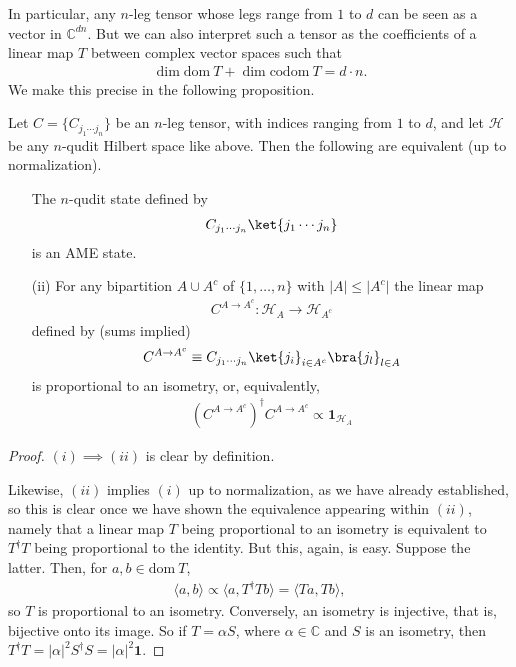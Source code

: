 In particular, any $n$-leg tensor whose legs range from $1$ to $d$ can be seen as a vector in $\mathbb{C}^{dn}$. But we can also interpret such a tensor as the coefficients of a linear map $T$ between complex vector spaces such that 
\begin{align*}
\dim\mathrm{dom~} T + \dim\mathrm{codom~} T = d\cdot n.
\end{align*}
We make this precise in the following proposition.

\begin{proposition}\label{prop:tensorAME}
Let $C=\{C_{j_1\cdots j_n}\}$ be an $n$-leg tensor, with indices ranging from $1$ to $d$, and let $\mathcal{H}$ be any $n$-qudit Hilbert space like above. Then the following are equivalent (up to normalization).
\begin{itemize}
\item[\text{(i)}] The $n$-qudit state defined by 
\begin{align*}
C_{j_1\cdots j_n}\ket{j_1\cdots j_n}
\end{align*}
is an AME state.
\item[(ii)] For any bipartition $A\cup A^c$ of $\{1,\ldots, n\}$ with $\lvert A \rvert\leq \lvert A^c \rvert$ the linear map
\begin{align*}
C^{A\to A^c} : \mathcal{H}_A \rightarrow\mathcal{H}_{A^c}
\end{align*}
defined by (sums implied)
\begin{align*}
C^{A\to A^c}\equiv C_{j_1\cdots j_n} \ket{j_i}_{i\in A^c}\bra{j_l}_{l\in A}
\end{align*}
is proportional to an isometry, or, equivalently, 
\begin{align*}
\left(C^{A\to A^c}\right)^\dagger C^{A\to A^c} \propto \mathbf{1}_{\mathcal{H}_A}
\end{align*}
\end{itemize}
\begin{proof}
$(i)\implies (ii)$ is clear by definition.

 Likewise, $(ii)$ implies $(i)$ up to normalization, as we have already established, so this is clear once we have shown the equivalence appearing within $(ii)$, namely that a linear map $T$ being proportional to an isometry is equivalent to $T^\dagger T$ being proportional to the identity. But this, again, is easy.
Suppose the latter. Then, for $a,b\in\mathrm{dom~}T$,
\begin{align*}
\langle a, b\rangle \propto \langle a, T^\dagger T b \rangle = \langle Ta, Tb \rangle,
\end{align*}
so $T$ is proportional to an isometry. Conversely, an isometry is injective, that is, bijective onto its image. So if $T=\alpha S$, where $\alpha\in \mathbb{C}$ and $S$ is an isometry, then $T^\dagger T = \lvert \alpha \rvert^2 S^\dagger S = \lvert \alpha \rvert^2 \mathbf{1}$.
\end{proof}
\end{proposition}

